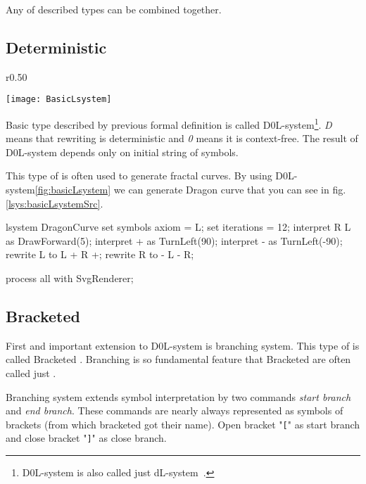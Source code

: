 Any of described types can be combined together.



\subsection{Deterministic \lsystems}

\newcommand{\dzerolsystem}{\mbox{D0L-system}\xspace}
\newcommand{\dlsystem}{\mbox{dL-system}\xspace}


\begin{wrapfigure}{r}{0.50\textwidth}
	\vspace{-40pt}
	\begin{center}
	\texttt{[image: BasicLsystem]}
	\end{center}
	\caption{Dragon curve}
	\label{fig:basicLsystem}
\end{wrapfigure}


Basic \lsystem type described by previous formal definition is called \dzerolsystem\footnote{\dzerolsystem is also called just \dlsystem~\cite{Zar04}.}.
\emph{D} means that rewriting is deterministic and \emph{0} means it is context-free.
The result of \dzerolsystem depends only on initial string of symbols.

This type of \lsystem is often used to generate fractal curves.
By using \dzerolsystem \ref{fig:basicLsystem} we can generate Dragon curve that you can see in fig. \ref{lsys:basicLsystemSrc}.

\begin{Lsystem}[label=lsys:basicLsystemSrc,caption={Basic \dzerolsystem for generation of Dragon curve (fig. \ref{fig:basicLsystem})}]
lsystem DragonCurve {
	set symbols axiom = L;
	set iterations = 12;
	interpret R L as DrawForward(5);
	interpret + as TurnLeft(90);
	interpret - as TurnLeft(-90);
	rewrite L to L + R +;
	rewrite R to - L - R;
}

process all with SvgRenderer;
\end{Lsystem}


\subsection{Bracketed \lsystems}

First and important extension to \dzerolsystem is branching system.
This type of \lsystem is called Bracketed \lsystem\cite{PL91}.
Branching is so fundamental feature that Bracketed \lsystems are often called just \lsystems.

Branching system extends symbol interpretation by two commands \emph{start branch} and \emph{end branch}.
These commands are nearly always represented as symbols of brackets (from which bracketed \lsystems got their name).
Open bracket "\texttt{[}" as start branch and close bracket "\texttt{]}" as close branch.

